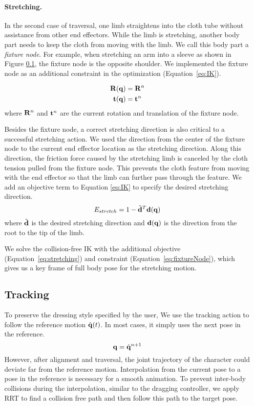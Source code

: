 \paragraph{Stretching.} In the second case of traversal, one limb straightens into the cloth tube without assistance from other end effectors. While the limb is stretching, another body part needs to keep the cloth from moving with the limb. We call this body part a \emph{fixture node}. For example, when stretching an arm into a sleeve as shown in Figure \ref{}, the fixture node is the opposite shoulder. We implemented the fixture node as an additional constraint in the optimization (Equation~\ref{eq:IK}).

\begin{align}
  \label{eq:fixtureNode}
  \mathbf{R}(\mathbf{q})& = \mathbf{R}^n\\
  \nonumber  \mathbf{t}(\mathbf{q})& = \mathbf{t}^n
\end{align}
where $\mathbf{R}^n$ and $\mathbf{t}^n$ are the current rotation and translation of the fixture node.

Besides the fixture node, a correct stretching direction is also critical to a successful stretching action. We used the direction from the center of the fixture node to the current end effector location as the stretching direction. Along this direction, the friction force caused by the stretching limb is canceled by the cloth tension pulled from the fixture node. This prevents the cloth feature from moving with the end effector so that the limb can further pass through the feature. We add an objective term to Equation \ref{eq:IK} to specify the desired stretching direction.
\begin{equation}
  E_{stretch} = 1 - \hat{\mathbf{d}}^T\mathbf{d(q)}
  \label{eq:stretching}
\end{equation}
where $\hat{\mathbf{d}}$ is the desired stretching direction and $\mathbf{d(q)}$ is the direction from the root to the tip of the limb.

We solve the collision-free IK with the additional objective (Equation~\ref{eq:stretching}) and constraint (Equation~\ref{eq:fixtureNode}), which gives us a key frame of full body pose for the stretching motion.


\subsection{Tracking}

To preserve the dressing style specified by the user, We use the tracking action to follow the reference motion $\hat{\mathbf{q}}(t)$. In most cases, it simply uses the next pose in the reference.
\begin{displaymath}
\mathbf{q} = \hat{\mathbf{q}}^{n+1}
\end{displaymath}
However, after alignment and traversal, the joint trajectory of the character could deviate far from the reference motion. Interpolation from the current pose to a pose in the reference is necessary for a smooth animation. To prevent inter-body collisions during the interpolation, similar to the dragging controller, we apply RRT \cite{} to find a collision free path and then follow this path to the target pose.


